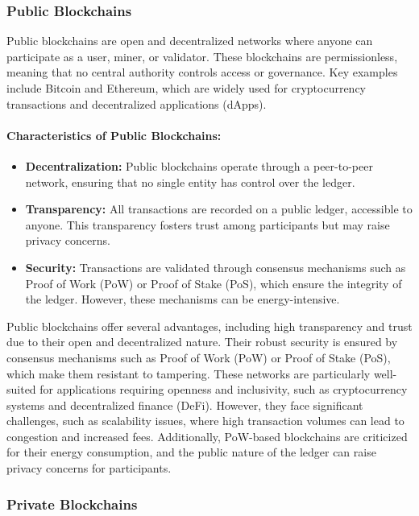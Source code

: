 \subsubsection{Public Blockchains}

Public blockchains are open and decentralized networks where anyone can participate as a user, miner, or validator. These blockchains are permissionless, meaning that no central authority controls access or governance. Key examples include Bitcoin and Ethereum, which are widely used for cryptocurrency transactions and decentralized applications (dApps). \cite{cachin_blockchain_2017}

\paragraph{Characteristics of Public Blockchains:}
\begin{itemize}
    \item \textbf{Decentralization:} Public blockchains operate through a peer-to-peer network, ensuring that no single entity has control over the ledger.
    \item \textbf{Transparency:} All transactions are recorded on a public ledger, accessible to anyone. This transparency fosters trust among participants but may raise privacy concerns.
    \item \textbf{Security:} Transactions are validated through consensus mechanisms such as Proof of Work (PoW) or Proof of Stake (PoS), which ensure the integrity of the ledger. However, these mechanisms can be energy-intensive.
\end{itemize}

Public blockchains offer several advantages, including high transparency and trust due to their open and decentralized nature. Their robust security is ensured by consensus mechanisms such as Proof of Work (PoW) or Proof of Stake (PoS), which make them resistant to tampering. These networks are particularly well-suited for applications requiring openness and inclusivity, such as cryptocurrency systems and decentralized finance (DeFi). However, they face significant challenges, such as scalability issues, where high transaction volumes can lead to congestion and increased fees. Additionally, PoW-based blockchains are criticized for their energy consumption, and the public nature of the ledger can raise privacy concerns for participants. 

\subsubsection{Private Blockchains}

